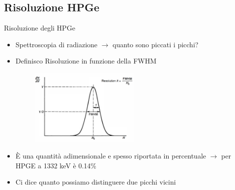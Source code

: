 \documentclass{beamer}
\begin{document}
\subsection{Risoluzione HPGe}
   
\begin{frame}{Risoluzione degli HPGe}
\begin{itemize}
    \item Spettroscopia di radiazione $\to$ quanto sono piccati i picchi?
    \item Definisco Risoluzione in funzione della FWHM
     \begin{figure}
        \centering
        \includegraphics[width=0.5\textwidth]{images/fwhm_resolution.png}
    \end{figure}
    \item È una quantità adimensionale e spesso riportata in percentuale $\to$ per HPGE a 1332 keV è 0.14\% 
   \item Ci dice quanto possiamo distinguere due picchi vicini
    \end{itemize}
    
\end{frame}
\end{document}
